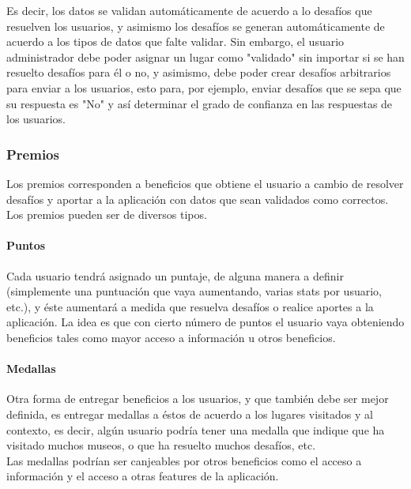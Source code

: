 \documentclass[10pt,letterpaper]{article}
\begin{document}
Es decir, los datos se validan automáticamente de acuerdo a lo desafíos que resuelven los usuarios, y asimismo los desafíos se generan automáticamente de acuerdo a los tipos de datos que falte validar. Sin embargo, el usuario administrador debe poder asignar un lugar como "validado" sin importar si se han resuelto desafíos para él o no, y asimismo, debe poder crear desafíos arbitrarios para enviar a los usuarios, esto para, por ejemplo, enviar desafíos que se sepa que su respuesta es "No" y así determinar el grado de confianza en las respuestas de los usuarios.\\

\subsubsection{Premios}

Los premios corresponden a beneficios que obtiene el usuario a cambio de resolver desafíos y aportar a la aplicación con datos que sean validados como correctos. Los premios pueden ser de diversos tipos.\\

\paragraph{Puntos}

Cada usuario tendrá asignado un puntaje, de alguna manera a definir (simplemente una puntuación que vaya aumentando, varias stats por usuario, etc.), y éste aumentará a medida que resuelva desafíos o realice aportes a la aplicación. La idea es que con cierto número de puntos el usuario vaya obteniendo beneficios tales como mayor acceso a información u otros beneficios.\\

\paragraph{Medallas}

Otra forma de entregar beneficios a los usuarios, y que también debe ser mejor definida, es entregar medallas a éstos de acuerdo a los lugares visitados y al contexto, es decir, algún usuario podría tener una medalla que indique que ha visitado muchos museos, o que ha resuelto muchos desafíos, etc.\\

Las medallas podrían ser canjeables por otros beneficios como el acceso a información y el acceso a otras features de la aplicación.\\
\end{document}
